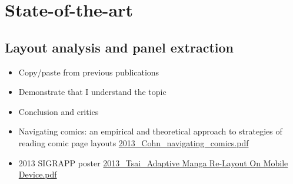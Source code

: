 \chapter{State-of-the-art} %
\label{chap:sota}
\graphicspath{{./chapters/3-state-of-the-art/figs/}}


\section{Layout analysis and panel extraction}
\label{sec:sota:layout_panel}

\begin{itemize}
	\item Copy/paste from previous publications
	\item Demonstrate that I understand the topic
	\item Conclusion and critics
	\item Navigating comics: an empirical and theoretical approach to strategies of reading comic page layouts \url{2013_Cohn_navigating_comics.pdf}
	\item 2013 SIGRAPP poster \url{2013_Tsai_Adaptive Manga Re-Layout On Mobile Device.pdf}
\end{itemize}

